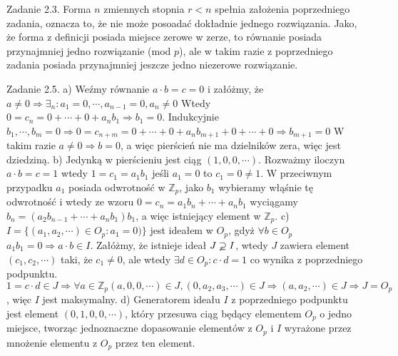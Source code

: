 \documentclass{article}
\begin{document}
Zadanie 2.3.
\newline
\newline
Forma $n$ zmiennych stopnia $r<n$ spełnia założenia poprzedniego zadania, oznacza to, że nie może posoadać dokładnie jednego rozwiązania.
Jako, że forma z definicji posiada miejsce zerowe w zerze, to równanie posiada przynajmniej jedno rozwiązanie (mod $p$),
ale w takim razie z poprzedniego zadania posiada przynajmniej jeszcze jedno niezerowe rozwiązanie.
\newline

Zadanie 2.5.
\newline
\newline
a) Weźmy równanie $a\cdot b=c=0$ i załóżmy, że $a\neq 0\Rightarrow \exists_n:a_1=0,\cdots,a_{n-1}=0,a_n\neq0$\newline
Wtedy $0=c_n=0+\cdots+0+a_nb_1\Rightarrow b_1=0$.\newline
Indukcyjnie $b_1,\cdots,b_m=0\Rightarrow 0=c_{n+m}=0+\cdots+0+a_nb_{m+1}+0+\cdots+0\Rightarrow b_{m+1}=0$\newline
W takim razie $a\neq0\Rightarrow b=0$, a więc pierścień nie ma dzielników zera, więc jest dziedziną.\newline\newline
b) Jedynką w pierścieniu jest ciąg $(1,0,0,\cdots)$.\newline
Rozważmy iloczyn $a\cdot b=c=1$ wtedy $1=c_1=a_1b_1$ jeśli $a_1=0$ to $c_1=0\neq 1$.\newline
W przeciwnym przypadku $a_1$ posiada odwrotność w $\mathbb{Z}_p$, jako $b_1$ wybieramy włąśnie tę odwrotność i wtedy ze wzoru $0=c_n=a_1b_n+\cdots+a_nb_1$ wyciągamy
$b_n=(a_2b_{n-1}+\cdots+a_nb_1)b_1$, a więc istniejący element w $\mathbb{Z}_p$.\newline\newline
c) $I=\{(a_1,a_2,\cdots)\in O_p:a_1=0)\}$ jest ideałem w $O_p$, gdyż $\forall b\in O_p$ $a_1b_1=0\Rightarrow a\cdot b\in I$.\newline
Załóżmy, że istnieje ideał $J\varsupsetneq I$, wtedy $J$ zawiera element $(c_1,c_2,\cdots)$ taki, że $c_1\neq0$, ale wtedy $\exists d\in O_p:c\cdot d=1$ co wynika z poprzedniego podpunktu.
$1=c\cdot d\in J\Rightarrow\forall a\in \mathbb{Z}_p (a,0,0,\cdots)\in J, (0,a_2,a_3,\cdots)\in J\Rightarrow (a,a_2,\cdots)\in J\Rightarrow J=O_p$, więc $I$ jest maksymalny.\newline\newline
d) Generatorem ideału $I$ z poprzedniego podpunktu jest element $(0,1,0,0,\cdots)$, który przesuwa ciąg będący elementem $O_p$ o jedno miejsce, tworząc jednoznaczne dopasowanie elementów
z $O_p$ i $I$ wyrażone przez mnożenie elementu z $O_p$ przez ten element. 
\end{document}
